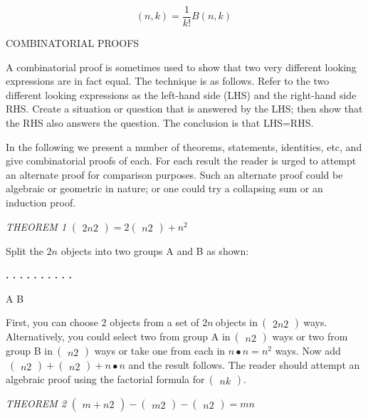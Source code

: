 \documentclass[10pt,letter]{article}
\begin{document}
\[
\left( n,k \right) = \frac{1}{k!}B\left( n,k \right)\
\]

COMBINATORIAL PROOFS

A combinatorial proof is sometimes used to show that two very different
looking expressions are in fact equal. The technique is as follows.
Refer to the two different looking expressions as the left-hand side
(LHS) and the right-hand side RHS. Create a situation or question that
is answered by the LHS; then show that the RHS also answers the
question. The conclusion is that LHS=RHS.

In the following we present a number of theorems, statements,
identities, etc, and give combinatorial proofs of each. For each result
the reader is urged to attempt an alternate proof for comparison
purposes. Such an alternate proof could be algebraic or geometric in
nature; or one could try a collapsing sum or an induction proof.

\emph{THEOREM 1} \(\begin{pmatrix}
2n
2
\end{pmatrix}
 = 2
\begin{pmatrix}
n
2
\end{pmatrix}
 + n^{2}\)

Split the \(2n\) objects into two groups A and B as shown:

\textbf{. . . . . . . . . . }

A B

First, you can choose 2 objects from a set of \(2n\ \)objects
in\(\
\begin{pmatrix}
2n
2
\end{pmatrix}
\ \)ways. Alternatively, you could select two from group A
in\(\
\begin{pmatrix}
n
2
\end{pmatrix}
\) ways or two from group B in\(\
\begin{pmatrix}
n
2
\end{pmatrix}
\) ways or take one from each in \(n \bullet n = n^{2}\)
ways. Now add\(\
\begin{pmatrix}
n
2
\end{pmatrix}
 +
\begin{pmatrix}
n
2
\end{pmatrix}
 + n \bullet n\) and the result follows. The reader should
attempt an algebraic proof using the factorial formula
for\(\
\begin{pmatrix}
n
k
\end{pmatrix}
\).

\emph{THEOREM 2} \(\begin{pmatrix}
m + n
2
\end{pmatrix}
 -
\begin{pmatrix}
m
2
\end{pmatrix}
 -
\begin{pmatrix}
n
2
\end{pmatrix}
 = mn\)
\end{document}
